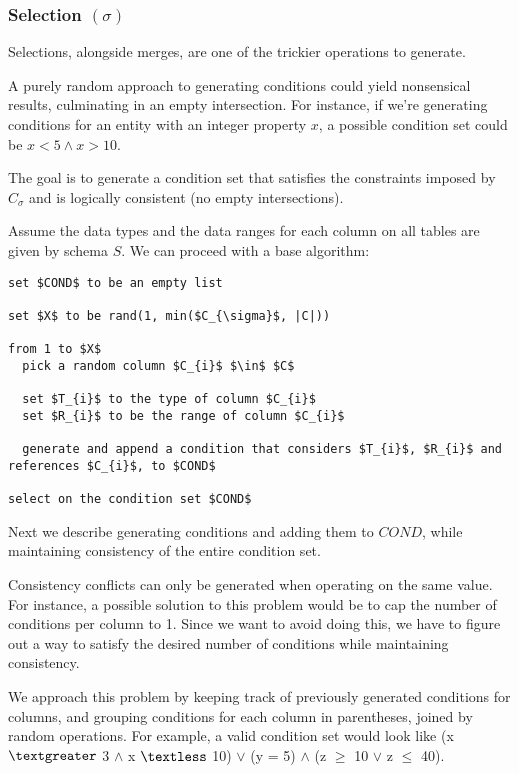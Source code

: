\documentclass[10pt, twocolumn]{article}
\begin{document}
\subsubsection*{Selection $(\sigma)$}

Selections, alongside merges, are one of the trickier operations to generate.

\spacing
\noindent
A purely random approach to generating conditions could yield nonsensical results, culminating in an empty intersection. For instance, if we're generating conditions for an entity with an integer property $x$, a possible condition set could be $x < 5 \land x > 10$.

\spacing
\noindent
The goal is to generate a condition set that satisfies the constraints imposed by $C_{\sigma}$ and is logically consistent (no empty intersections).

\spacing
\noindent
Assume the data types and the data ranges for each column on all tables are given by schema $S$. We can proceed with a base algorithm:

\spacing
\begin{lstlisting}
set $COND$ to be an empty list

set $X$ to be rand(1, min($C_{\sigma}$, |C|))

from 1 to $X$
  pick a random column $C_{i}$ $\in$ $C$

  set $T_{i}$ to the type of column $C_{i}$
  set $R_{i}$ to be the range of column $C_{i}$

  generate and append a condition that considers $T_{i}$, $R_{i}$ and references $C_{i}$, to $COND$

select on the condition set $COND$
\end{lstlisting}

\spacing
\noindent
Next we describe generating conditions and adding them to $COND$, while maintaining consistency of the entire condition set.

\spacing
\noindent
Consistency conflicts can only be generated when operating on the same value. For instance, a possible solution to this problem would be to cap the number of conditions per column to 1. Since we want to avoid doing this, we have to figure out a way to satisfy the desired number of conditions while maintaining consistency.

\spacing
\noindent
We approach this problem by keeping track of previously generated conditions for columns, and grouping conditions for each column in parentheses, joined by random operations. For example, a valid condition set would look like (x $\textgreater$ 3 $\land$ x $\textless$ 10) $\lor$ (y = 5) $\land$ (z $\geq$ 10 $\lor$ z $\leq$ 40).
\end{document}
